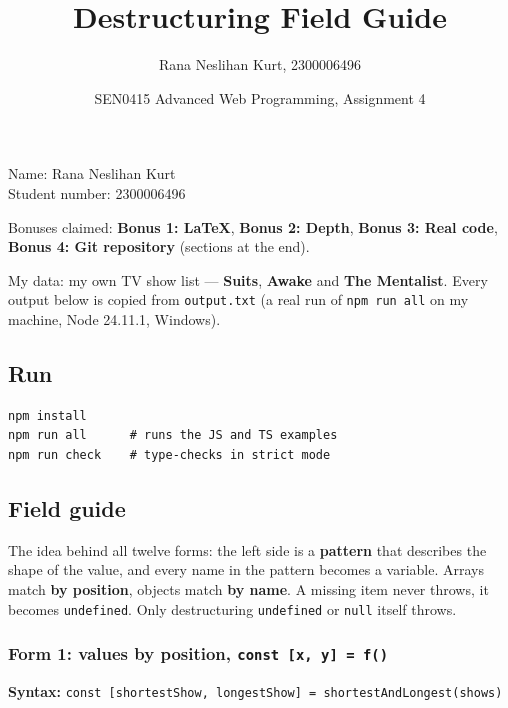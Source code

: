 \documentclass[
  10pt,
]{article}
\title{Destructuring Field Guide}
\author{Rana Neslihan Kurt, 2300006496}
\date{SEN0415 Advanced Web Programming, Assignment 4}
\newcommand{\passthrough}[1]{#1}
\begin{document}
\maketitle

{
\hypersetup{linkcolor=}
\setcounter{tocdepth}{3}
\tableofcontents
}
Name: Rana Neslihan Kurt\\
Student number: 2300006496

Bonuses claimed: \textbf{Bonus 1: LaTeX}, \textbf{Bonus 2: Depth},
\textbf{Bonus 3: Real code}, \textbf{Bonus 4: Git repository} (sections
at the end).

My data: my own TV show list --- \textbf{Suits}, \textbf{Awake} and
\textbf{The Mentalist}. Every output below is copied from
\passthrough{\lstinline!output.txt!} (a real run of
\passthrough{\lstinline!npm run all!} on my machine, Node 24.11.1,
Windows).

\hypertarget{run}{%
\subsection{Run}\label{run}}

\begin{lstlisting}
npm install
npm run all      # runs the JS and TS examples
npm run check    # type-checks in strict mode
\end{lstlisting}

\hypertarget{field-guide}{%
\subsection{Field guide}\label{field-guide}}

The idea behind all twelve forms: the left side is a \textbf{pattern}
that describes the shape of the value, and every name in the pattern
becomes a variable. Arrays match \textbf{by position}, objects match
\textbf{by name}. A missing item never throws, it becomes
\passthrough{\lstinline!undefined!}. Only destructuring
\passthrough{\lstinline!undefined!} or \passthrough{\lstinline!null!}
itself throws.

\hypertarget{form-1-values-by-position-const-x-y-f}{%
\subsubsection{\texorpdfstring{Form 1: values by position,
\texttt{const\ {[}x,\ y{]}\ =\ f()}}{Form 1: values by position, const {[}x, y{]} = f()}}\label{form-1-values-by-position-const-x-y-f}}

\textbf{Syntax:}
\passthrough{\lstinline!const [shortestShow, longestShow] = shortestAndLongest(shows)!}
\end{document}
